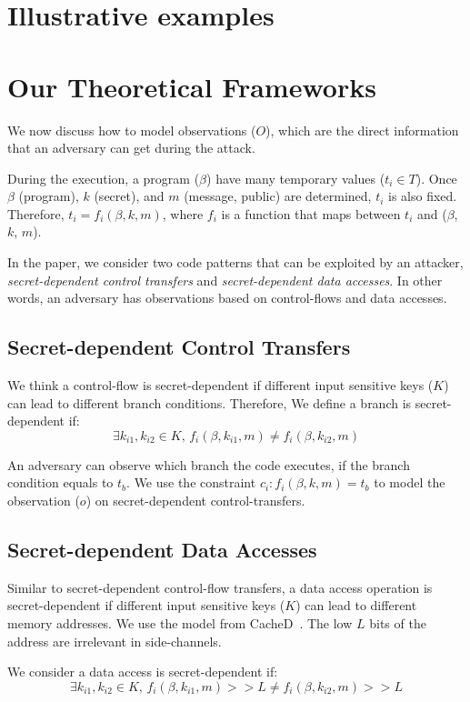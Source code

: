 \section{Illustrative examples}

\section{Our Theoretical Frameworks}
We now discuss how to model observations ($O$), which are the direct information
that an adversary can get during the attack.

During the execution, a program ($\beta$) have many temporary values ($t_i \in
T$). Once $\beta$ (program), $k$ (secret), and $m$ (message, public) are
determined, $t_i$ is also fixed. Therefore, $ t_i = f_i(\beta, k, m)$, where $f_
i$ is a function that maps between $t_i$ and ($\beta$, $k$, $m$).

In the paper, we consider two code patterns that can be exploited by an attacker,
\emph{secret-dependent control transfers} and \emph{secret-dependent data
accesses}. In other words, an adversary has observations based on control-flows
and data accesses.

\subsection{Secret-dependent Control Transfers}
We think a control-flow is secret-dependent if different input sensitive keys
($K$) can lead to different branch conditions. Therefore,
We define a branch is secret-dependent if:
$$\exists k_{i1}, k_{i2} \in K, \,f_i(\beta, k_{i1}, m) \neq f_i(\beta, k_{i2}, m)$$

An adversary can observe which branch the code executes, if the branch condition
equals to $t_b$. We use the constraint $c_i : f_i(\beta, k, m) = t_b$ to model
the observation ($o$) on secret-dependent control-transfers.

\subsection{Secret-dependent Data Accesses}
Similar to secret-dependent control-flow transfers, a data access operation is
secret-dependent if different input sensitive keys ($K$) can lead to different
memory addresses. We use the model from CacheD~\cite{203878}. The low $L$ bits
of the address are irrelevant in side-channels.

We consider a data access is secret-dependent if:
$$\exists k_{i1}, k_{i2} \in K, \,f_i(\beta, k_{i1}, m) >> L \neq f_i(\beta, k_{i2}, m) >> L$$


